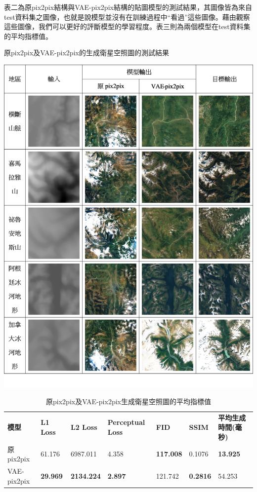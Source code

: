 \documentclass[a4paper, 12pt]{article}
\begin{document}
表二為原pix2pix結構與VAE-pix2pix結構的貼圖模型的測試結果，其圖像皆為來自test資料集之圖像，也就是說模型並沒有在訓練過程中“看過”這些圖像。藉由觀察這些圖像，我們可以更好的評斷模型的學習程度。表三則為兩個模型在test資料集的平均指標值。

\begin{table}[H]
    \centering
    \caption{原pix2pix及VAE-pix2pix的生成衛星空照圖的測試結果}
    \label{tab:2}
    \includegraphics[width=0.8\linewidth]{fig/tab2.jpg}
\end{table}

\begin{table}[H]
    \caption{原pix2pix及VAE-pix2pix生成衛星空照圖的平均指標值}
    \label{tab:3}
    \begin{tabularx}{\linewidth}{|Y|Y|Y|Y|Y|Y|Y|}
        \hline
        \textbf{模型} & \textbf{L1 Loss} & \textbf{L2 Loss} & \textbf{Perceptual Loss} & \textbf{FID}    & \textbf{SSIM} & \textbf{平均生成時間(毫秒)} \\ \hhline{|=|=|=|=|=|=|=|}
        原pix2pix     & 61.176            & 6987.011         & 4.358 & \textbf{117.008} & 0.1076         & \textbf{13.925}              \\ \hline
        VAE-pix2pix   & \textbf{29.969}  & \textbf{2134.224} & \textbf{2.897}          & 121.742        & \textbf{0.2816} & 54.253                      \\ \hline
    \end{tabularx}
\end{table}
\end{document}
